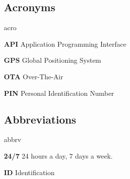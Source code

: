 \subsection{Acronyms}
	\begin{labeling}{acro}
		\item[\textbf{API}] Application Programming Interface
		\item[\textbf{GPS}] Global Positioning System
		\item[\textbf{OTA}] Over-The-Air
		\item[\textbf{PIN}] Personal Identification Number
	\end{labeling}

\subsection{Abbreviations}
	\begin{labeling}{abbrv}
		\item[\textbf{24/7}] 24 hours a day, 7 days a week.
		\item[\textbf{ID}] Identification
	\end{labeling}